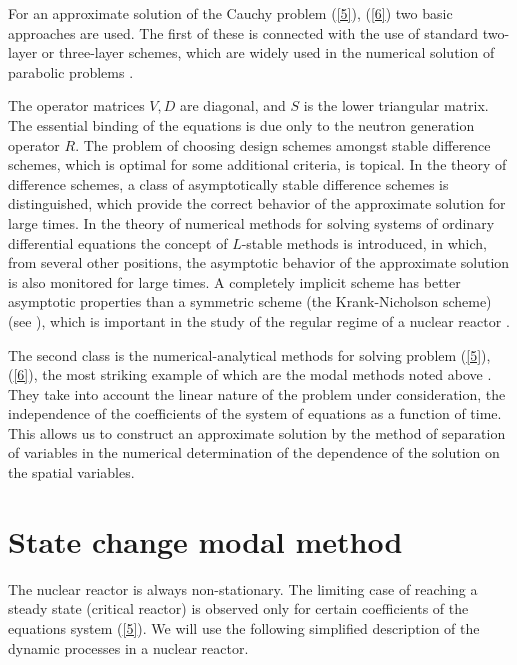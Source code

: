 \documentclass[authoryear]{elsarticle}
\begin{document}
For an approximate solution of the Cauchy problem  (\ref{5}), (\ref{6}) 
two basic approaches are used. The first of these is connected with the use of standard two-layer or three-layer schemes, which are widely used in the numerical solution of parabolic problems  \citep{Samarskiibook}.

The operator matrices  $V, D$ are diagonal, and  $S$ is the lower triangular matrix. The essential binding of the equations is due only to the neutron generation operator $R$.
The problem of choosing design schemes amongst stable difference schemes, which is optimal for some additional criteria, is topical. In the theory of difference schemes, a class of asymptotically stable difference schemes is distinguished, which  \citep{samarskii1996computational} provide the correct behavior of the approximate solution for large times. In the theory of numerical methods for solving systems of ordinary differential equations  \citep{Butcher2008,Gear1971} the concept of  $L$-stable methods is introduced, in which, from several other positions, the asymptotic behavior of the approximate solution is also monitored for large times. A completely implicit scheme has better asymptotic properties than a symmetric scheme (the Krank-Nicholson scheme)  (see \cite{VabishchevichSM}), 
which is important in the study of the regular regime of a nuclear reactor \citep{nd-mm}.

The second class is the numerical-analytical methods for solving problem  (\ref{5}), (\ref{6}),
the most striking example of which are the modal methods noted above \citep{stacey1967modal,stacey1969space,sutton1996diffusion}.
They take into account the linear nature of the problem under consideration, the independence of the coefficients of the system of equations as a function of time. This allows us to construct an approximate solution by the method of separation of variables in the numerical determination of the dependence of the solution on the spatial variables.

\section{State change modal method} 

The nuclear reactor is always non-stationary. The limiting case of reaching a steady state (critical reactor) is observed only for certain coefficients of the equations system (\ref{5}). 
We will use the following simplified description of the dynamic processes in a nuclear reactor.
\end{document}
